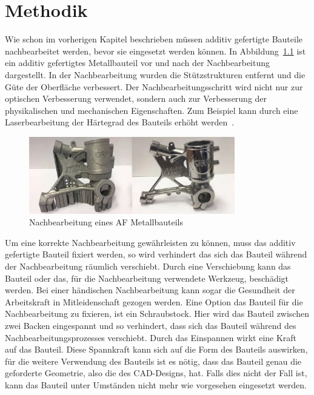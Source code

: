 \chapter{Methodik}

Wie schon im vorherigen Kapitel beschrieben müssen additiv gefertigte Bauteile 
nachbearbeitet werden, bevor sie eingesetzt werden können. In Abbildung~\ref{fig:post-pro}
ist ein additiv gefertigtes Metallbauteil vor und nach der Nachbearbeitung dargestellt.
In der Nachbearbeitung wurden die Stützstrukturen entfernt und die Güte der Oberfläche 
verbessert. 
Der Nachbearbeitungsschritt wird nicht nur zur optischen Verbesserung verwendet, sondern 
auch zur Verbesserung der physikalischen und mechanischen Eigenschaften. 
Zum Beispiel kann durch eine Laserbearbeitung der Härtegrad des Bauteils erhöht 
werden~\cite{Mahmood.2022}.

\begin{figure}[H]
    \centering
    \includegraphics[width=0.8\textwidth]{images/post-processing.PNG}
    \caption{Nachbearbeitung eines AF Metallbauteils~\cite{unionfab.22.08.2023}}
    \label{fig:post-pro}
\end{figure}

Um eine korrekte Nachbearbeitung gewährleisten zu können, muss das additiv 
gefertigte Bauteil fixiert werden, so wird verhindert das sich das Bauteil während der 
Nachbearbeitung räumlich verschiebt. Durch eine Verschiebung kann das Bauteil oder das, für
die Nachbearbeitung verwendete Werkzeug, beschädigt werden. Bei einer händischen 
Nachbearbeitung kann sogar die Gesundheit der Arbeitskraft in Mitleidenschaft gezogen werden.
Eine Option das Bauteil für die Nachbearbeitung zu fixieren, ist ein Schraubstock. 
Hier wird das Bauteil zwischen zwei Backen eingespannt und so verhindert, dass sich das
Bauteil während des Nachbearbeitungsprozesses verschiebt. Durch das Einspannen wirkt eine 
Kraft auf das Bauteil. Diese Spannkraft kann sich auf die Form des Bauteils auswirken, für 
die weitere Verwendung des Bauteils ist es nötig, dass das Bauteil genau die geforderte 
Geometrie, also die des CAD-Designs, hat. Falls dies nicht der Fall ist, kann das Bauteil
unter Umständen nicht mehr wie vorgesehen eingesetzt werden.

